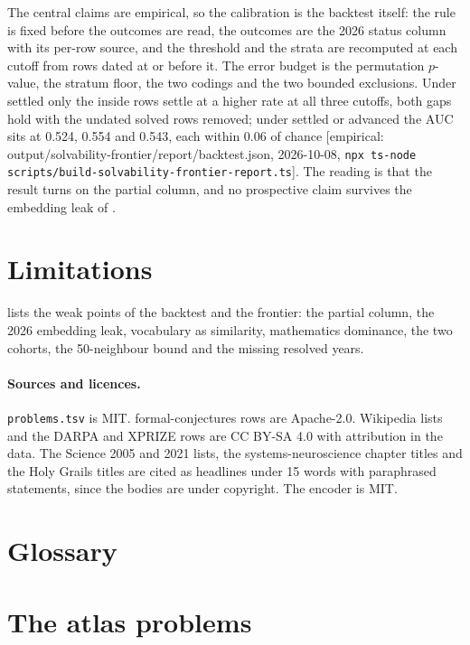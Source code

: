 \documentclass[11pt]{article}
\newcommand{\emp}[1]{\textcolor{bucketgray}{\footnotesize [empirical: #1]}}
\newcommand{\cmd}{\texttt{npx ts-node scripts/build-solvability-frontier-report.ts}}
\newcommand{\bt}{\emp{output/solvability-frontier/report/backtest.json, 2026-10-08, \cmd}}
\begin{document}
The central claims are empirical, so the calibration is the backtest itself: the rule is fixed before the outcomes are read, the outcomes are the 2026 status column with its per-row source, and the threshold and the strata are recomputed at each cutoff from rows dated at or before it. The error budget is the permutation $p$-value, the stratum floor, the two codings and the two bounded exclusions. Under settled only the inside rows settle at a higher rate at all three cutoffs, both gaps hold with the undated solved rows removed; under settled or advanced the AUC sits at 0.524, 0.554 and 0.543, each within 0.06 of chance \bt. The reading is that the result turns on the partial column, and no prospective claim survives the embedding leak of .

\section{Limitations}
\label{sec:limitations}

 lists the weak points of the backtest and the frontier: the partial column, the 2026 embedding leak, vocabulary as similarity, mathematics dominance, the two cohorts, the 50-neighbour bound and the missing resolved years.

\paragraph{Sources and licences.}
\texttt{problems.tsv} is MIT. formal-conjectures rows are Apache-2.0. Wikipedia lists and the DARPA and XPRIZE rows are CC BY-SA 4.0 with attribution in the data. The Science 2005 and 2021 lists, the systems-neuroscience chapter titles and the Holy Grails titles are cited as headlines under 15 words with paraphrased statements, since the bodies are under copyright. The encoder is MIT.

\printbibliography

\appendix

\section{Glossary}
\label{app:glossary}


\section{The atlas problems}
\label{app:atlas}
\end{document}

